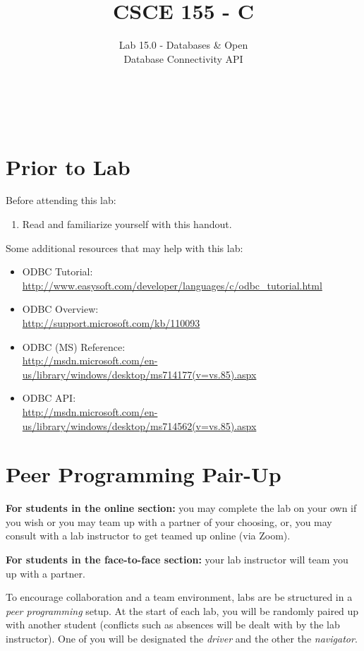 \documentclass[12pt]{scrartcl}
\title{CSCE 155 - C}
\subtitle{Lab 15.0 - Databases \& Open \\Database Connectivity API}
\author{~}
\date{~}
\begin{document}
\maketitle

\section*{Prior to Lab}

Before attending this lab:
\begin{enumerate}
  \item Read and familiarize yourself with this handout.
\end{enumerate}

Some additional resources that may help with this lab:
\begin{itemize}
  \item ODBC Tutorial: \\
  	\url{http://www.easysoft.com/developer/languages/c/odbc_tutorial.html}
  \item ODBC Overview:  \\
  	\url{http://support.microsoft.com/kb/110093}
  \item ODBC (MS) Reference: \\
  	\url{http://msdn.microsoft.com/en-us/library/windows/desktop/ms714177(v=vs.85).aspx}
  \item ODBC API: \\
  	\url{http://msdn.microsoft.com/en-us/library/windows/desktop/ms714562(v=vs.85).aspx}
\end{itemize}

\section*{Peer Programming Pair-Up}

\textbf{For students in the online section:} you may complete
the lab on your own if you wish or you may team up with a partner
of your choosing, or, you may consult with a lab instructor to get
teamed up online (via Zoom).

\textbf{For students in the face-to-face section:} your
lab instructor will team you up with a partner.  

To encourage collaboration and a team environment, labs are be
structured in a \emph{peer programming} setup.  At the start of
each lab, you will be randomly paired up with another student 
(conflicts such as absences will be dealt with by the lab instructor).
One of you will be designated the \emph{driver} and the other
the \emph{navigator}.  
\end{document}
